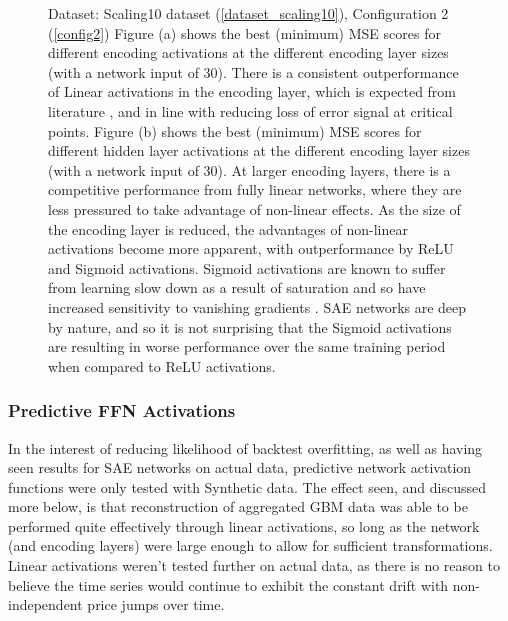 \documentclass[a4paper,11pt,oneside]{article}
\theoremstyle{plain}
\theoremstyle{definition}
\begin{document}
\begin{figure}[H]
		\caption[MSE by Activations and Encoding Layer Size]
		{Dataset: Scaling10 dataset (\ref{dataset_scaling10}), Configuration 2 (\ref{config2})
			\newline Figure (a) shows the best (minimum) MSE scores for different encoding activations at the different encoding layer sizes (with a network input of 30). There is a consistent outperformance of Linear activations in the encoding layer, which is expected from literature \citep{Hinton2}, and in line with reducing loss of error signal at critical points. 
			\newline Figure (b) shows the best (minimum) MSE scores for different hidden layer activations at the different encoding layer sizes (with a network input of 30). At larger encoding layers, there is a competitive performance from fully linear networks, where they are less pressured to take advantage of non-linear effects. As the size of the encoding layer is reduced, the advantages of non-linear activations become more apparent, with outperformance by ReLU and Sigmoid activations. Sigmoid activations are known to suffer from learning slow down as a result of saturation and so have increased sensitivity to vanishing gradients \citep{Glorot2}. SAE networks are deep by nature, and so it is not surprising that the Sigmoid activations are resulting in worse performance over the same training period when compared to ReLU activations. \newline}
		\label{figure-mse_encoding_activations}
	\end{figure}
	
	
	\subsubsection{Predictive FFN Activations}
	
	In the interest of reducing likelihood of backtest overfitting, as well as having seen results for SAE networks on actual data, predictive network activation functions were only tested with Synthetic data.	The effect seen, and discussed more below, is that reconstruction of aggregated GBM data was able to be performed quite effectively through linear activations, so long as the network (and encoding layers) were large enough to allow for sufficient transformations. Linear activations weren't tested further on actual data, as there is no reason to believe the time series would continue to exhibit the constant drift with non-independent price jumps over time. 
	
\end{document}

